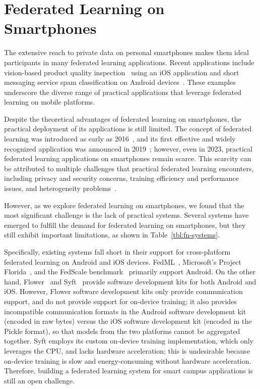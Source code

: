 \section{Federated Learning on Smartphones}

The extensive reach to private data on personal smartphones makes them ideal
participants in many federated learning applications.
Recent applications include vision-based product quality
inspection~\cite{bharti2022edge}
using an iOS application and short messaging service spam classification on Android
devices~\cite{sriraman2022device}.
These examples underscore the diverse range of practical applications that
leverage federated learning on mobile platforms.

Despite the theoretical advantages of federated learning on smartphones,
the practical deployment of its applications is still limited.
The concept of federated learning was introduced as early as
2016~\cite{mcmahan2017communication},
and its first effective and widely recognized application was announced in
2019~\cite{bonawitz2019towards}; however, even in 2023,
practical federated learning applications on smartphones remain scarce.
This scarcity can be attributed to multiple challenges that practical federated
learning encounters, including privacy and security concerns,
training efficiency and performance issues,
and heterogeneity problems~\cite{wen2023survey}.

However, as we explore federated learning on smartphones,
we found that the most significant challenge is the lack of practical systems.
Several systems have emerged to fulfill the demand for federated learning
on smartphones, but they still exhibit important limitations,
as shown in Table~\ref{tbl:fn-systems}.

Specifically, existing systems fall short in their support for
cross-platform federated learning on Android and iOS devices.
FedML~\cite{he2020fedml},
Microsoft's Project Florida~\cite{madrigal2023project},
and the FedScale benchmark~\cite{lai2022fedscale} primarily support Android.
On the other hand,
Flower~\cite{beutel2020flower,mathur2021ondevice} and
Syft~\cite{ryffel2018generic,Ziller2021,hall2021syft}
provide software development kits for both Android and iOS.
However, Flower software development kits only provide communication support,
and do not provide support for on-device training;
it also provides incompatible communication formats in
the Android software development kit (encoded in raw bytes)
versus the iOS software development kit (encoded in the Pickle format),
so that models from the two platforms cannot be aggregated together.
Syft employs its custom on-device training implementation,
which only leverages the CPU, and lacks hardware acceleration;
this is undesirable because on-device training is slow and energy-consuming
without hardware acceleration.
Therefore, building a federated learning system for smart campus applications is
still an open challenge.

